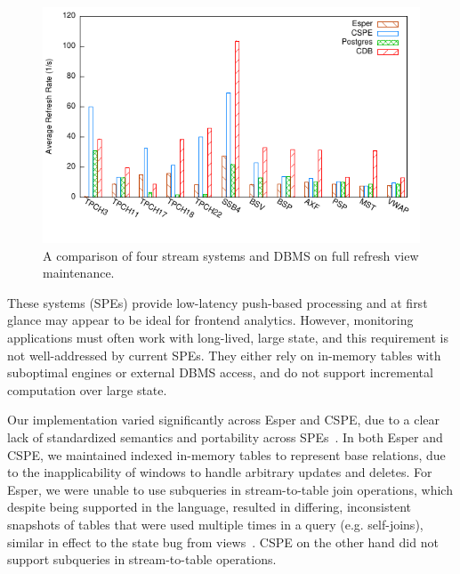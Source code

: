 \begin{figure}[t]
\vspace{-1mm}
\begin{center}
\includegraphics[scale=0.85]{../graphs/graphs/engine_bakeoff.pdf}
\end{center}
\vspace{-8mm}
\caption{A comparison of four stream systems and DBMS on full refresh view
maintenance.}
\label{fig:enginecomp}
\vspace{-4mm}
\end{figure}


\vspace{1mm}
These systems (SPEs) provide low-latency push-based processing and at first
glance may appear to be ideal for frontend analytics.
However, monitoring applications must often work with long-lived, large state,
and this requirement is not well-addressed by current SPEs. They either rely on
in-memory tables with suboptimal engines or external DBMS access, and do not
support incremental computation over large state.

Our implementation varied significantly across Esper and CSPE, due to a
clear lack of standardized semantics and portability across
SPEs~\cite{botan-pvldb:10,jain-pvldb:08}.
In both Esper and CSPE, we maintained indexed in-memory tables to represent base
relations, due to the inapplicability of windows to handle arbitrary updates and
deletes.
For Esper, we were unable to use subqueries in stream-to-table join operations,
which despite being supported in the language, resulted in differing,
inconsistent snapshots of tables that were used multiple times in a query (e.g.
self-joins), similar in effect to the state bug from
views~\cite{colby-sigmod:96}.
CSPE on the other hand did not support subqueries in stream-to-table operations.

